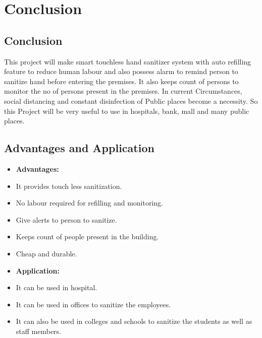 
\chapter{Conclusion}

\section{Conclusion}

     This project will make smart touchless hand sanitizer system with auto refilling feature to reduce human labour and also possess alarm to remind person to sanitize hand before entering the premises. It also keeps count of persons to monitor the no of persons present in the premises. In current Circumstances, social distancing and constant disinfection of Public places become a necessity. So this Project will be very useful to use in hospitals, bank, mall and many public places.
 
 \newpage    
 \section{Advantages and Application}     

\begin{itemize}
 	\item \Large\textbf {Advantages:}
	\item {It provides touch less sanitization.}
	\item {No labour required for refilling and monitoring.}
	\item {Give alerts to person to sanitize.}
	\item {Keeps count of people present in the building.}
	\item {Cheap and durable.}	
\end{itemize}


\begin{itemize}
 	\item \Large\textbf {Application:}
 	\item {It can be used in hospital.}
	\item {It can be used in offices to sanitize the employees.}
	\item {It can also be used in colleges and schools to sanitize the students as well as staff members.}
\end{itemize}
 


